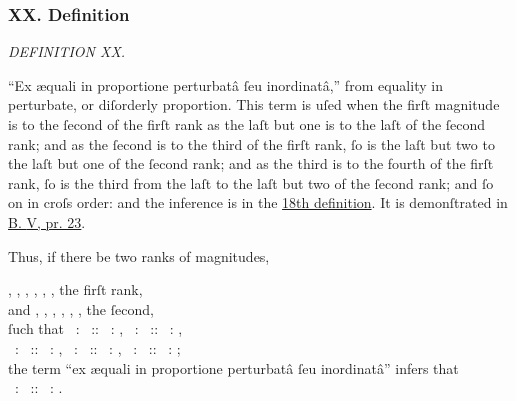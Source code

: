 \documentclass[12pt,preview]{standalone}
\begin{document}
\subsubsection{XX. Definition}

\begin{minipage}{\textwidth}

    \begin{center}
        \textit{DEFINITION XX.}\label{book5def20} \\
    \end{center}

    \hfill

    \newcommand{\redA}{{\color{cred}{A}}}
    \newcommand{\redB}{{\color{cred}{B}}}
    \newcommand{\redP}{{\color{cred}{P}}}
    \newcommand{\redQ}{{\color{cred}{Q}}}
    \newcommand{\blueC}{{\color{cblue}{C}}}
    \newcommand{\blueD}{{\color{cblue}{D}}}
    \newcommand{\blueN}{{\color{cblue}{N}}}
    \newcommand{\blueO}{{\color{cblue}{O}}}
    \newcommand{\yellowE}{{\color{cyellow}{E}}}
    \newcommand{\yellowF}{{\color{cyellow}{F}}}
    \newcommand{\yellowL}{{\color{cyellow}{L}}}
    \newcommand{\yellowM}{{\color{cyellow}{M}}}

    \raggedright “Ex \ae quali in proportione perturbatâ ſeu inordinatâ,” from equality in perturbate, or diſorderly proportion. This term is uſed when the firſt magnitude is to the ſecond of the firſt rank as the laſt but one is to the laſt of the ſecond rank; and as the ſecond is to the third of the firſt rank, ſo is the laſt but two to the laſt but one of the ſecond rank; and as the third is to the fourth of the firſt rank, ſo is the third from the laſt to the laſt but two of the ſecond rank; and ſo on in croſs order: and the inference is in the \hyperref[book5def18]{18th definition}. It is demonſtrated in \hyperref[book5pr23]{B. \textsc{V}, pr. 23}.

    \hfill

    Thus, if there be two ranks of magnitudes,\\

    \hfill

    \begin{center}
        \redA, \redB, \blueC, \blueD, \yellowE, \yellowF, the firſt rank,\\
        and \yellowL, \yellowM, \blueN, \blueO, \redP, \redQ, the ſecond,\\
        ſuch that \redA\ : \redB\ :: \redP\ : \redQ, \redB\ : \blueC\ :: \blueO\ : \redP,\\
        \blueC\ : \blueD\ :: \blueN\ : \blueO, \blueD\ : \yellowE\ :: \yellowM\ : \blueN, \yellowE\ : \yellowF\ :: \yellowL\ : \yellowM;\\
        the term “ex æquali in proportione perturbatâ ſeu inordinatâ” infers that\\
        \redA\ : \yellowF\ :: \yellowL\ : \redQ.
    \end{center}

    \hfill

\end{minipage}
\end{document}
